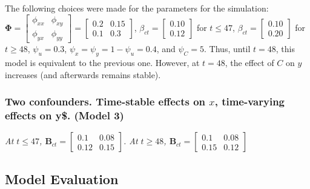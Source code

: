 \documentclass[
]{interact}
\begin{document}
The following choices were made for the parameters for the simulation:
\(\boldsymbol{\Phi} = \begin{bmatrix} \phi_{xx} & \phi_{xy}\\ \phi_{yx} & \phi_{yy} \end{bmatrix} = \begin{bmatrix} 0.2 & 0.15\\ 0.1 & 0.3 \end{bmatrix}\),
\(\beta_{ct} = \begin{bmatrix} 0.10\\0.12 \end{bmatrix}\) for
\(t \le 47\), \(\beta_{ct} = \begin{bmatrix} 0.10\\0.20 \end{bmatrix}\)
for \(t \ge 48\), \(\psi_u = 0.3\),
\(\psi_x = \psi_y = 1 - \psi_u = 0.4\), and \(\psi_C = 5\). Thus, until
\(t = 48\), this model is equivalent to the previous one. However, at
\(t = 48\), the effect of \(C\) on \(y\) increases (and afterwards
remains stable).

\hypertarget{two-confounders.-time-stable-effects-on-x-time-varying-effects-on-y.-model-3}{%
\subsubsection{\texorpdfstring{Two confounders. Time-stable effects on
\(x\), time-varying effects on y\$. (Model
3)}{Two confounders. Time-stable effects on x, time-varying effects on y\$. (Model 3)}}\label{two-confounders.-time-stable-effects-on-x-time-varying-effects-on-y.-model-3}}

\emph{At \(t \le 47\),
\(\textbf{B}_{ct} = \begin{bmatrix} 0.1 & 0.08\\ 0.12 & 0.15 \end{bmatrix}\).
At \(t \ge 48\),
\(\textbf{B}_{ct} = \begin{bmatrix} 0.1 & 0.08\\ 0.15 & 0.12 \end{bmatrix}\)}

\hypertarget{model-evaluation}{%
\subsection{Model Evaluation}\label{model-evaluation}}
\end{document}
